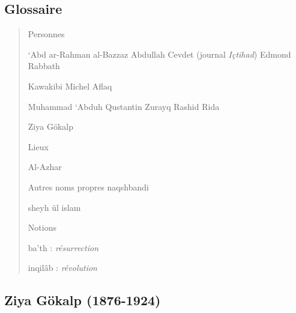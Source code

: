 \hypertarget{glossaire-3}{%
\subsection{\texorpdfstring{{Glossaire}}{Glossaire}}\label{glossaire-3}}

\begin{quote}
{Personnes}

`Abd ar-Rahman al-Bazzaz Abdullah Cevdet (journal \emph{Içtihad}) Edmond
Rabbath

Kawakibi Michel Aflaq

Muhammad `Abduh Qustantin Zurayq Rashid Rida

Ziya Gökalp

{Lieux}

Al-Azhar

{Autres noms propres} naqshbandi

sheyh ül islam

{Notions}

ba'th : \emph{résurrection}

inqilâb : \emph{révolution}
\end{quote}

\hypertarget{ziya-guxf6kalp-1876-1924}{%
\subsection{\texorpdfstring{{Ziya Gökalp
(1876-1924)}}{Ziya Gökalp (1876-1924)}}\label{ziya-guxf6kalp-1876-1924}}

